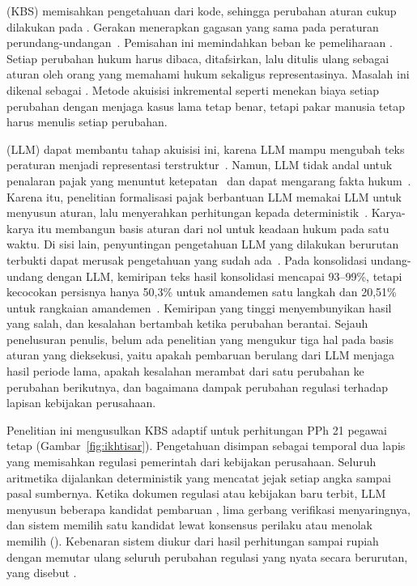  (KBS) memisahkan pengetahuan dari kode, sehingga perubahan aturan cukup dilakukan pada . Gerakan  menerapkan gagasan yang sama pada peraturan perundang-undangan~\cite{merigoux2021catala,mowbray2023scaling,kowalski2022logicalenglish}. Pemisahan ini memindahkan beban ke pemeliharaan . Setiap perubahan hukum harus dibaca, ditafsirkan, lalu ditulis ulang sebagai aturan oleh orang yang memahami hukum sekaligus representasinya. Masalah ini dikenal sebagai . Metode akuisisi inkremental seperti  menekan biaya setiap perubahan dengan menjaga kasus lama tetap benar, tetapi pakar manusia tetap harus menulis setiap perubahan.

 (LLM) dapat membantu tahap akuisisi ini, karena LLM mampu mengubah teks peraturan menjadi representasi terstruktur~\cite{janatian2023texttostructure}. Namun, LLM tidak andal untuk penalaran pajak yang menuntut ketepatan~\cite{blairstanek2023gpt3,nay2024taxattorneys} dan dapat mengarang fakta hukum~\cite{dahl2024legalfictions,magesh2025hallucination}. Karena itu, penelitian formalisasi pajak berbantuan LLM memakai LLM untuk menyusun aturan, lalu menyerahkan perhitungan kepada  deterministik~\cite{veeramani2026neurosymbolic,yadamsuren2026formalization,lorenzo2025translating,jurayj2026tax}. Karya-karya itu membangun basis aturan dari nol untuk keadaan hukum pada satu waktu. Di sisi lain, penyuntingan pengetahuan LLM yang dilakukan berurutan terbukti dapat merusak pengetahuan yang sudah ada~\cite{gupta2024forgetting,gu2024harms}. Pada konsolidasi undang-undang dengan LLM, kemiripan teks hasil konsolidasi mencapai 93--99\%, tetapi kecocokan persisnya hanya 50,3\% untuk amandemen satu langkah dan 20,51\% untuk rangkaian amandemen~\cite{prior2025risks}. Kemiripan yang tinggi menyembunyikan hasil yang salah, dan kesalahan bertambah ketika perubahan berantai. Sejauh penelusuran penulis, belum ada penelitian yang mengukur tiga hal pada basis aturan yang dieksekusi, yaitu apakah pembaruan berulang dari LLM menjaga hasil periode lama, apakah kesalahan merambat dari satu perubahan ke perubahan berikutnya, dan bagaimana dampak perubahan regulasi terhadap lapisan kebijakan perusahaan.

Penelitian ini mengusulkan KBS adaptif untuk perhitungan PPh 21 pegawai tetap (Gambar~\ref{fig:ikhtisar}). Pengetahuan disimpan sebagai  temporal dua lapis yang memisahkan regulasi pemerintah dari kebijakan perusahaan. Seluruh aritmetika dijalankan  deterministik yang mencatat jejak setiap angka sampai pasal sumbernya. Ketika dokumen regulasi atau kebijakan baru terbit, LLM menyusun beberapa kandidat pembaruan , lima gerbang verifikasi menyaringnya, dan sistem memilih satu kandidat lewat konsensus perilaku atau menolak memilih (). Kebenaran sistem diukur dari hasil perhitungan sampai rupiah dengan memutar ulang seluruh perubahan regulasi yang nyata secara berurutan, yang disebut .

